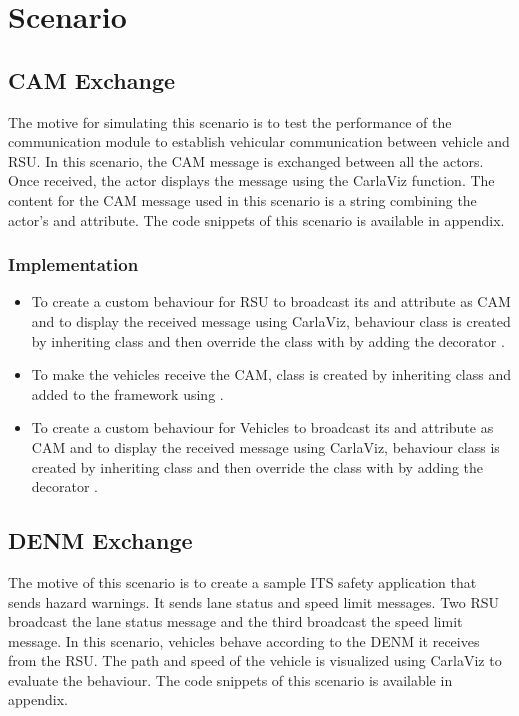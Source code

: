 \section{Scenario}
\subsection{CAM Exchange}
The motive for simulating this scenario is to test the performance of the communication module to establish vehicular communication between vehicle and RSU. In this scenario, the CAM message is exchanged between all the actors. Once received, the actor displays the message using the CarlaViz  function. The content for the CAM message used in this scenario is a string combining the actor's  and  attribute. The code snippets of this scenario is available in appendix.

\subsubsection{Implementation}
\begin{itemize}
    \item To create a custom behaviour for RSU to broadcast its  and  attribute as CAM and to display the received message using CarlaViz,  behaviour class is created by inheriting  class and then override the  class with  by adding the decorator .

    \item To make the vehicles receive the CAM,  class is created by inheriting  class and added to the framework using .

    \item To create a custom behaviour for Vehicles to broadcast its  and  attribute as CAM and to display the received message using CarlaViz,  behaviour class is created by inheriting  class and then override the  class with  by adding the decorator .

\end{itemize}


\subsection{DENM Exchange}
The motive of this scenario is to create a sample ITS safety application that sends hazard warnings. It sends lane status and speed limit messages. Two RSU broadcast the lane status message and the third broadcast the speed limit message. In this scenario, vehicles behave according to the DENM it receives from the RSU. The path and speed of the vehicle is visualized using CarlaViz to evaluate the behaviour. The code snippets of this scenario is available in appendix.
